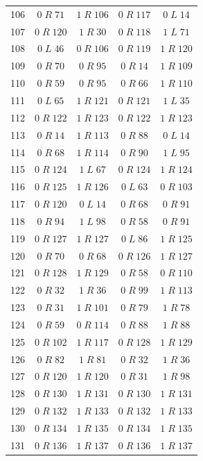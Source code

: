 \begin{longtable}{rcccc}
106 & $0\;R\;71$ & $1\;R\;106$ & $0\;R\;117$ & $0\;L\;14$\\
107 & $0\;R\;120$ & $1\;R\;30$ & $0\;R\;118$ & $1\;L\;71$\\
108 & $0\;L\;46$ & $0\;R\;106$ & $0\;R\;119$ & $1\;R\;120$\\
109 & $0\;R\;70$ & $0\;R\;95$ & $0\;R\;14$ & $1\;R\;109$\\
110 & $0\;R\;59$ & $0\;R\;95$ & $0\;R\;66$ & $1\;R\;110$\\
111 & $0\;L\;65$ & $1\;R\;121$ & $0\;R\;121$ & $1\;L\;35$\\
112 & $0\;R\;122$ & $1\;R\;123$ & $0\;R\;122$ & $1\;R\;123$\\
113 & $0\;R\;14$ & $1\;R\;113$ & $0\;R\;88$ & $0\;L\;14$\\
114 & $0\;R\;68$ & $1\;R\;114$ & $0\;R\;90$ & $1\;L\;95$\\
115 & $0\;R\;124$ & $1\;L\;67$ & $0\;R\;124$ & $1\;R\;124$\\
116 & $0\;R\;125$ & $1\;R\;126$ & $0\;L\;63$ & $0\;R\;103$\\
117 & $0\;R\;120$ & $0\;L\;14$ & $0\;R\;68$ & $0\;R\;91$\\
118 & $0\;R\;94$ & $1\;L\;98$ & $0\;R\;58$ & $0\;R\;91$\\
119 & $0\;R\;127$ & $1\;R\;127$ & $0\;L\;86$ & $1\;R\;125$\\
120 & $0\;R\;70$ & $0\;R\;68$ & $0\;R\;126$ & $1\;R\;127$\\
121 & $0\;R\;128$ & $1\;R\;129$ & $0\;R\;58$ & $0\;R\;110$\\
122 & $0\;R\;32$ & $1\;R\;36$ & $0\;R\;99$ & $1\;R\;113$\\
123 & $0\;R\;31$ & $1\;R\;101$ & $0\;R\;79$ & $1\;R\;78$\\
124 & $0\;R\;59$ & $0\;R\;114$ & $0\;R\;88$ & $1\;R\;88$\\
125 & $0\;R\;102$ & $1\;R\;117$ & $0\;R\;128$ & $1\;R\;129$\\
126 & $0\;R\;82$ & $1\;R\;81$ & $0\;R\;32$ & $1\;R\;36$\\
127 & $0\;R\;120$ & $1\;R\;120$ & $0\;R\;31$ & $1\;R\;98$\\
128 & $0\;R\;130$ & $1\;R\;131$ & $0\;R\;130$ & $1\;R\;131$\\
129 & $0\;R\;132$ & $1\;R\;133$ & $0\;R\;132$ & $1\;R\;133$\\
130 & $0\;R\;134$ & $1\;R\;135$ & $0\;R\;134$ & $1\;R\;135$\\
131 & $0\;R\;136$ & $1\;R\;137$ & $0\;R\;136$ & $1\;R\;137$\\

\end{longtable}

